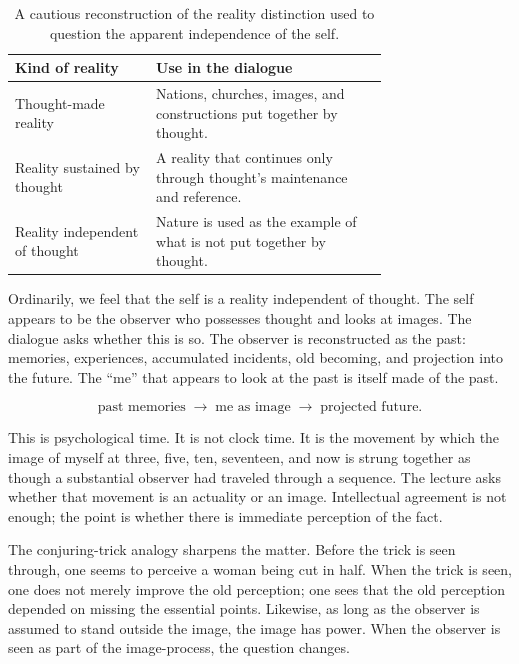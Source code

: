 \begin{table}
\centering
\begin{tabular}{|p{0.28\linewidth}|p{0.46\linewidth}|}
\hline
\textbf{Kind of reality} & \textbf{Use in the dialogue} \\
\hline
Thought-made reality & Nations, churches, images, and constructions put together by thought. \\
\hline
Reality sustained by thought & A reality that continues only through thought's maintenance and reference. \\
\hline
Reality independent of thought & Nature is used as the example of what is not put together by thought. \\
\hline
\end{tabular}
\caption{A cautious reconstruction of the reality distinction used to question the apparent independence of the self.}
\end{table}

Ordinarily, we feel that the self is a reality independent of thought. The self appears to be the observer who possesses thought and looks at images. The dialogue asks whether this is so. The observer is reconstructed as the past: memories, experiences, accumulated incidents, old becoming, and projection into the future. The ``me'' that appears to look at the past is itself made of the past.

\begin{equation}
\text{past memories}
\;\longrightarrow\;
\text{me as image}
\;\longrightarrow\;
\text{projected future}.
\end{equation}

This is psychological time. It is not clock time. It is the movement by which the image of myself at three, five, ten, seventeen, and now is strung together as though a substantial observer had traveled through a sequence. The lecture asks whether that movement is an actuality or an image. Intellectual agreement is not enough; the point is whether there is immediate perception of the fact.

The conjuring-trick analogy sharpens the matter. Before the trick is seen through, one seems to perceive a woman being cut in half. When the trick is seen, one does not merely improve the old perception; one sees that the old perception depended on missing the essential points. Likewise, as long as the observer is assumed to stand outside the image, the image has power. When the observer is seen as part of the image-process, the question changes.

